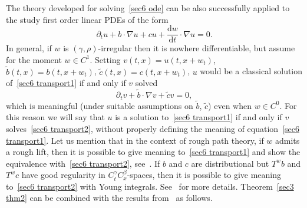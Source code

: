 \documentclass[10pt]{article}
\newcommand{\mathd}{\mathrm{d}}
\begin{document}
The theory developed for solving~{\eqref{sec6 ode}} can be also successfully
applied to the study first order linear PDEs of the form
\begin{equation}
  \partial_t u + b \cdot \nabla u + c u + \frac{\mathd w}{\mathd t} \cdot
  \nabla u = 0. \label{sec6 transport1}
\end{equation}
In general, if $w$ is $(\gamma, \rho)$\mbox{-}irregular then it is nowhere
differentiable, but assume for the moment $w \in C^1$. Setting $v (t, x) = u
(t, x + w_t)$, $\tilde{b} (t, x) = b (t, x + w_t)$, $\tilde{c} (t, x) = c (t,
x + w_t)$, $u$ would be a classical solution of~{\eqref{sec6 transport1}} if
and only if $v$ solved
\begin{equation}
  \partial_t v + \tilde{b} \cdot \nabla v + \tilde{c} v = 0, \label{sec6
  transport2}
\end{equation}
which is meaningful (under suitable assumptions on $\tilde{b}$, $\tilde{c}$)
even when $w \in C^0$. For this reason we will say that $u$ is a solution
to~{\eqref{sec6 transport1}} if and only if $v$ solves~{\eqref{sec6
transport2}}, without properly defining the meaning of equation~{\eqref{sec6
transport1}}. Let us mention that in the context of rough path theory, if $w$
admits a rough lift, then it is possible to give meaning to~{\eqref{sec6
transport1}} and show the equivalence with~{\eqref{sec6 transport2}},
see~{\cite{catellier}}. If $b$ and $c$ are distributional but $T^w b$ and $T^w
c$ have good regularity in $C^{\gamma}_t C^{\beta}_x$\mbox{-}spaces, then it
is possible to give meaning to~{\eqref{sec6 transport2}} with Young integrals.
See~{\cite{galeatigubinelli_ode}} for more details. Theorem~\ref{sec3 thm2}
can be combined with the results from~{\cite{galeatigubinelli_ode}} as
follows.
\end{document}
